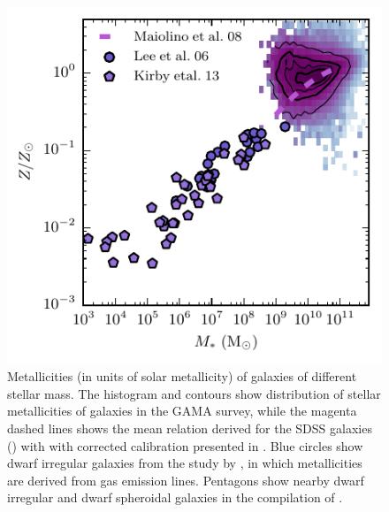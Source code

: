 \begin{figure}[t]
\centerline{
\includegraphics[scale=1.5]{fig/MsZ.pdf}}
\caption{Metallicities (in units of solar metallicity) of galaxies of different stellar mass. The histogram and contours show distribution of stellar metallicities of galaxies in the GAMA survey, while the magenta dashed lines shows the mean relation derived for the SDSS galaxies (\href{http://adsabs.harvard.edu/abs/2004ApJ...613..898T}{\citealt{tremonti_etal04}}) with with corrected calibration presented in \citet{maiolino_etal08}.
Blue circles show dwarf irregular galaxies from the study by \href{http://adsabs.harvard.edu/abs/2006ApJ...647..970L}{\citealt{lee_etal06}}, in which metallicities are derived from gas emission lines. Pentagons show nearby dwarf irregular and dwarf spheroidal galaxies in the compilation of \href{http://adsabs.harvard.edu/abs/2013ApJ...779..102K}{\citealt{kirby_etal13}}.  \label{fig:MsZ}}
\end{figure}

